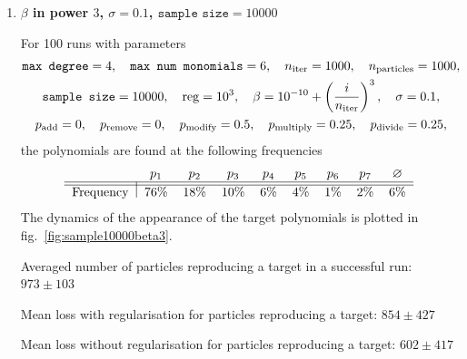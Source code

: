 \documentclass[11pt]{article}
\begin{document}
  \begin{enumerate}
  		\item {\bfseries \boldmath $\beta$ in power $3$, $\sigma = 0.1$, $\texttt{sample size} = 10000$}

	  For 100 runs with parameters
		\begin{equation} \label{eq:sample10000beta3}
			\begin{gathered}
				\texttt{max degree} = 4, \quad \texttt{max num monomials} = 6, \quad n_{\rm iter} = 1000, \quad n_{\rm particles} = 1000, \\
				\texttt{sample size} = 10000, \quad {\rm reg} = 10^{3}, \quad \beta = 10^{-10} + \left(\frac{i}{n_{\rm iter}}\right)^{3}, \quad \sigma = 0.1, \\
				p_{\rm add} = 0, \quad p_{\rm remove} = 0, \quad p_{\rm modify} = 0.5, \quad p_{\rm multiply} = 0.25, \quad p_{\rm divide} = 0.25,
			\end{gathered}
		\end{equation}
		the polynomials are found at the following frequencies
	  \begin{equation}
	  	\begin{tabular}{l|cccccccc}
	  		& $p_{1}$ & $p_{2}$ & $p_{3}$ & $p_{4}$ & $p_{5}$ & $p_{6}$ & $p_{7}$ & $\varnothing$ \\\hline\hline
	  		Frequency & 76\% & 18\% & 10\% & 6\% & 4\% & 1\% & 2\% & 6\%
	  	\end{tabular}
	  \end{equation}
	  The dynamics of the appearance of the target polynomials is plotted in fig.~\ref{fig:sample10000beta3}.

	  Averaged number of particles reproducing a target in a successful run: $973 \pm 103$

	  Mean loss with regularisation for particles reproducing a target: $854 \pm 427$

	  Mean loss without regularisation for particles reproducing a target: $602 \pm 417$


\end{enumerate}
\end{document}
